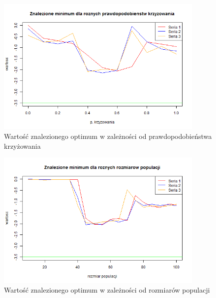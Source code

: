 \documentclass[11pt, a4paper]{article}
\begin{document}
\begin{figure}[H]
	\begin{center}
		\includegraphics[width=0.9\textwidth]{./assets/Zeldasine203.png} %
		\caption{Wartość znalezionego optimum w zależności od prawdopodobieństwa krzyżowania}
		\label{fig:zeldasine3}
	\end{center}
\end{figure}

\begin{figure}[H]
	\begin{center}
		\includegraphics[width=0.9\textwidth]{./assets/Zeldasine204.png} %
		\caption{Wartość znalezionego optimum w zależności od rozmiarów populacji}
		\label{fig:zeldasine4}
	\end{center}
\end{figure}
\end{document}
